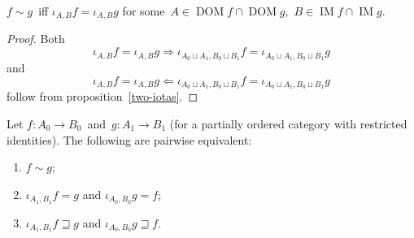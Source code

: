 \begin{prop}
$f\sim g$~iff $\iota_{A,B}f=\iota_{A,B}g$ for
some~$A\in\operatorname{DOM}f\cap\operatorname{DOM}g$,~$B\in\operatorname{IM}f\cap\operatorname{IM}g$.
\end{prop}

\begin{proof}
Both
\[\iota_{A,B}f=\iota_{A,B}g\Rightarrow
\iota_{A_0\sqcup A_1,B_0\sqcup B_1}f=\iota_{A_0\sqcup A_1,B_0\sqcup B_1}g\]
and
\[\iota_{A,B}f=\iota_{A,B}g\Leftarrow
\iota_{A_0\sqcup A_1,B_0\sqcup B_1}f=\iota_{A_0\sqcup A_1,B_0\sqcup B_1}g\]
follow from proposition~\ref{two-iotas}.
\end{proof}

\begin{thm}\label{uf-sim-cond}
Let
$f:A_0\to B_0$~and~$g:A_1\to B_1$
(for a partially ordered category with restricted identities).
The following are pairwise equivalent:
\begin{enumerate}
\item\label{uf-sim-cond-sim} $f\sim g$;
\item\label{uf-sim-cond-eq} $\iota_{A_1,B_1}f=g$ and $\iota_{A_0,B_0}g=f$;
\item\label{uf-sim-cond-sb} $\iota_{A_1,B_1}f\sqsupseteq g$ and $\iota_{A_0,B_0}g\sqsupseteq f$.
\end{enumerate}
\end{thm}


